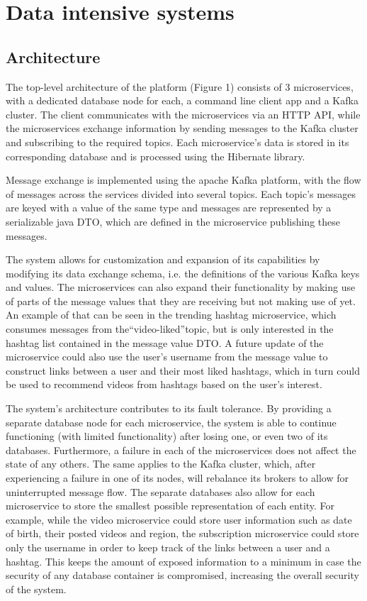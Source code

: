 \documentclass[parskip=full]{article}
\begin{document}
    \tableofcontents
    \pagebreak
    \section{Data intensive systems}
    \subsection{Architecture}
    The top-level architecture of the platform (Figure 1) consists of 3 microservices, with a dedicated database node for each, a command line client app and a Kafka cluster.
    The client communicates with the microservices via an HTTP API, while the microservices exchange information by sending messages to the Kafka cluster and subscribing to the required topics.
    Each microservice's data is stored in its corresponding database and is processed using the Hibernate library.

    Message exchange is implemented using the apache Kafka platform, with the flow of messages across the services divided into several topics.
    Each topic's messages are keyed with a value of the same type and messages are represented by a serializable java DTO, which are defined in the microservice publishing these messages.

    The system allows for customization and expansion of its capabilities by modifying its data exchange schema, i.e. the definitions of the various Kafka keys and values.
    The microservices can also expand their functionality by making use of parts of the message values that they are receiving but not making use of yet.
    An example of that can be seen in the trending hashtag microservice, which consumes messages from the``video-liked''topic, but is only interested in the hashtag list contained in the message value DTO. A future update of the microservice could also use the user's username from the message value to construct links between a user and their most liked hashtags, which in turn could be used to recommend videos from hashtags based on the user's interest.

    The system's architecture contributes to its fault tolerance.
    By providing a separate database node for each microservice, the system is able to continue functioning (with limited functionality) after losing one, or even two of its databases.
    Furthermore, a failure in each of the microservices does not affect the state of any others.
    The same applies to the Kafka cluster, which, after experiencing a failure in one of its nodes, will rebalance its brokers to allow for uninterrupted message flow.
    The separate databases also allow for each microservice to store the smallest possible representation of each entity.
    For example, while the video microservice could store user information such as date of birth, their posted videos and region, the subscription microservice could store only the username in order to keep track of the links between a user and a hashtag.
    This keeps the amount of exposed information to a minimum in case the security of any database container is compromised, increasing the overall security of the system.
\end{document}
